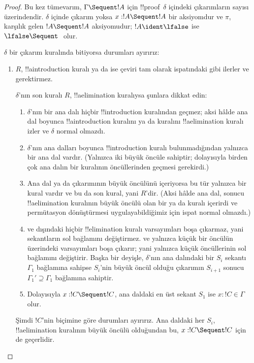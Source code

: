 \documentclass[../../../include/open-logic-section]{subfiles}
\begin{document}
\begin{proof}
Bu kez tümevarım, $\Gamma \Sequent !A$ için !!{proof}~$\delta$ içindeki
çıkarımların sayısı üzerindendir. $\delta$ içinde çıkarım yoksa
$x:!A \Sequent !A$ bir aksiyomdur ve $\pi$, karşılık gelen $!A \Sequent
!A$ aksiyomudur; $!A \ident \lfalse$ ise $\lfalse \Sequent \ $ olur.

$\delta$ bir çıkarım kuralında bitiyorsa durumları ayırırız:
\begin{enumerate}
  \item $R$, !!a{introduction} kuralı ya da \FalseInt ise çeviri
  tam olarak  ispatındaki gibi ilerler
  ve \Cut{} gerektirmez.

  $\delta$'nın son kuralı $R$, !!a{elimination} kuralıysa şunlara
  dikkat edin:
  \begin{enumerate}
    \item $\delta$'nın bir ana dalı hiçbir !!{introduction} kuralından
    geçmez; aksi hâlde ana dal boyunca !!a{introduction} kuralını ya da
    \FalseInt{} kuralını !!a{elimination} kuralı izler ve $\delta$
    normal olmazdı.
    \item $\delta$'nın ana dalları boyunca !!{introduction} kuralı
    bulunmadığından yalnızca bir ana dal vardır. (Yalnızca
    \Intro{\land} iki büyük öncüle sahiptir; dolayısıyla birden çok ana
    dalın bir \Intro{\land} kuralının öncüllerinden geçmesi gerekirdi.)
    \item Ana dal \Elim{\lor} ya da \Elim{\lexists} çıkarımının büyük
    öncülünü içeriyorsa bu tür yalnızca bir kural vardır ve bu da son
    kural, yani $R$'dir. (Aksi hâlde ana dal, sonucu !!a{elimination}
    kuralının büyük öncülü olan bir \Elim{\lor} ya da \Elim{\lexists}
    kuralı içerirdi ve permütasyon dönüştürmesi uygulayabildiğimiz için
    ispat normal olmazdı.)
  \item \Elim{\lor} ve \Elim{\lexists} dışındaki hiçbir
  !!{elimination} kuralı varsayımları boşa çıkarmaz, yani sekantların
  sol bağlamını değiştirmez. \Elim{\lor} ve \Elim{\lexists}
  yalnızca küçük bir öncülün üzerindeki varsayımları boşa çıkarır; yani
  yalnızca küçük öncüllerinin sol bağlamını değiştirir. Başka bir
  deyişle, $\delta$'nın ana dalındaki bir $S_i$ sekantı
  $\Gamma_1$ bağlamına sahipse $S_i$'nin büyük öncül olduğu çıkarımın
  $S_{i+1}$ sonucu $\Gamma_1' \supseteq \Gamma_1$ bağlamına sahiptir.
  \item Dolayısıyla $x: !C \Sequent !C$, ana daldaki en üst sekant
  $S_1$ ise $x:!C \in \Gamma$ olur.
  \end{enumerate}
  Şimdi $!C$'nin biçimine göre durumları ayırırız. Ana daldaki her
  $S_i$, !!a{elimination} kuralının büyük öncülü olduğundan bu,
  $x:!C \Sequent !C$ için de geçerlidir.


\end{enumerate}
\end{proof}
\end{document}
